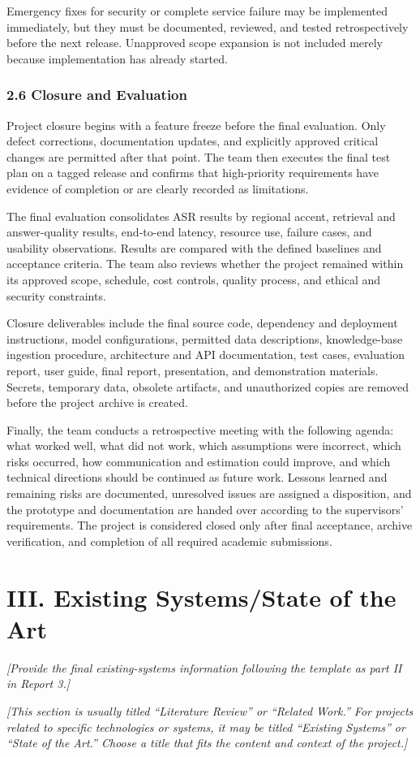 \documentclass[11pt,a4paper]{article}
\newcommand{\guidance}[1]{%
  {\color{guidanceblue}\itshape [#1]\par}%
}
\newcommand{\chapterstart}[1]{\clearpage\section{#1}}
\begin{document}
Emergency fixes for security or complete service failure may be implemented
immediately, but they must be documented, reviewed, and tested retrospectively
before the next release. Unapproved scope expansion is not included merely
because implementation has already started.

\subsubsection{2.6 Closure and Evaluation}

Project closure begins with a feature freeze before the final evaluation. Only
defect corrections, documentation updates, and explicitly approved critical
changes are permitted after that point. The team then executes the final test
plan on a tagged release and confirms that high-priority requirements have
evidence of completion or are clearly recorded as limitations.

The final evaluation consolidates ASR results by regional accent, retrieval and
answer-quality results, end-to-end latency, resource use, failure cases, and
usability observations. Results are compared with the defined baselines and
acceptance criteria. The team also reviews whether the project remained within
its approved scope, schedule, cost controls, quality process, and ethical and
security constraints.

Closure deliverables include the final source code, dependency and deployment
instructions, model configurations, permitted data descriptions, knowledge-base
ingestion procedure, architecture and API documentation, test cases, evaluation
report, user guide, final report, presentation, and demonstration materials.
Secrets, temporary data, obsolete artifacts, and unauthorized copies are
removed before the project archive is created.

Finally, the team conducts a retrospective meeting with the following agenda:
what worked well, what did not work, which assumptions were incorrect, which
risks occurred, how communication and estimation could improve, and which
technical directions should be continued as future work. Lessons learned and
remaining risks are documented, unresolved issues are assigned a disposition,
and the prototype and documentation are handed over according to the
supervisors' requirements. The project is considered closed only after final
acceptance, archive verification, and completion of all required academic
submissions.

\chapterstart{III. Existing Systems/State of the Art}
\guidance{Provide the final existing-systems information following the
template as part II in Report 3.}
\guidance{This section is usually titled ``Literature Review'' or ``Related
Work.'' For projects related to specific technologies or systems, it may be
titled ``Existing Systems'' or ``State of the Art.'' Choose a title that fits
the content and context of the project.}
\end{document}
